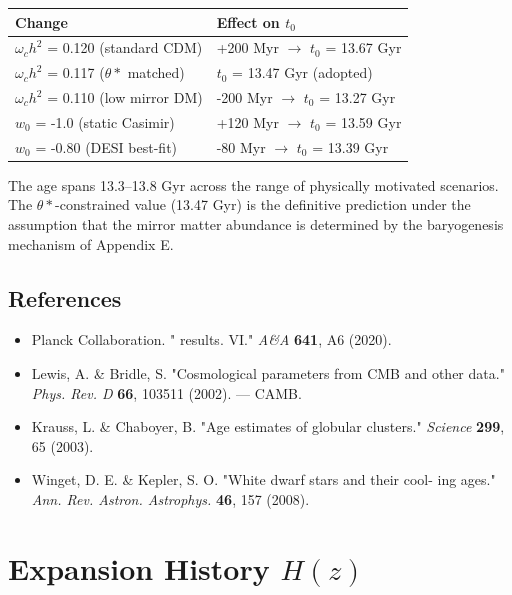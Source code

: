 \documentclass[aps,prd,preprint,superscriptaddress,longbibliography]{revtex4-2}
\begin{document}
\begin{table}[H]
\begin{ruledtabular}
\begin{tabular}{p{7.5cm}p{7.5cm}}
Change & Effect on $t_{0}$ \\
\hline
$\omega_c h^{2}$ = 0.120 (standard CDM) & +200 Myr $\to$ $t_{0}$ = 13.67 Gyr \\
$\omega_c h^{2}$ = 0.117 ($\theta*$ matched) & $t_{0}$ = 13.47 Gyr (adopted) \\
$\omega_c h^{2}$ = 0.110 (low mirror DM) & -200 Myr $\to$ $t_{0}$ = 13.27 Gyr \\
$w_{0}$ = -1.0 (static Casimir) & +120 Myr $\to$ $t_{0}$ = 13.59 Gyr \\
$w_{0}$ = -0.80 (DESI best-fit) & -80 Myr $\to$ $t_{0}$ = 13.39 Gyr \\
\end{tabular}
\end{ruledtabular}
\end{table}

The age spans 13.3--13.8 Gyr across the range of physically motivated scenarios. The $\theta*$-constrained value (13.47 Gyr) is the definitive prediction under the assumption that the mirror matter abundance is determined by the baryogenesis mechanism of Appendix E.



\subsection{References}


\begin{itemize}
  \item Planck Collaboration. "\cite{Planck2018_VI} results. VI." \textit{A\&A} \textbf{641}, A6 (2020).
  \item Lewis, A. \& Bridle, S. "Cosmological parameters from CMB and other data." \textit{Phys. Rev. D} \textbf{66}, 103511 (2002). --- CAMB.
  \item Krauss, L. \& Chaboyer, B. "Age estimates of globular clusters." \textit{Science} \textbf{299}, 65 (2003).
  \item Winget, D. E. \& Kepler, S. O. "White dwarf stars and their cool- ing ages." \textit{Ann. Rev. Astron. Astrophys.} \textbf{46}, 157 (2008).
\end{itemize}


\section{Expansion History $H(z)$}
\end{document}
